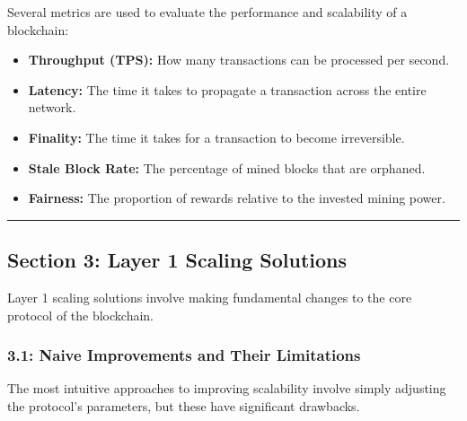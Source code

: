 Several metrics are used to evaluate the performance and scalability of
a blockchain:

\begin{itemize}
\tightlist
\item
  \textbf{Throughput (TPS):} How many transactions can be processed per
  second.
\item
  \textbf{Latency:} The time it takes to propagate a transaction across
  the entire network.
\item
  \textbf{Finality:} The time it takes for a transaction to become
  irreversible.
\item
  \textbf{Stale Block Rate:} The percentage of mined blocks that are
  orphaned.
\item
  \textbf{Fairness:} The proportion of rewards relative to the invested
  mining power.
\end{itemize}

\begin{center}\rule{0.5\linewidth}{0.5pt}\end{center}

\subsection{Section 3: Layer 1 Scaling
Solutions}\label{section-3-layer-1-scaling-solutions}

Layer 1 scaling solutions involve making fundamental changes to the core
protocol of the blockchain.

\subsubsection{3.1: Naive Improvements and Their
Limitations}\label{naive-improvements-and-their-limitations}

The most intuitive approaches to improving scalability involve simply
adjusting the protocol's parameters, but these have significant
drawbacks.


